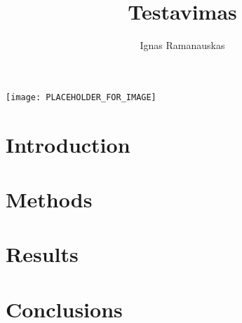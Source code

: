 \documentclass{article}
\author{Ignas Ramanauskas}
\title{Testavimas}
\begin{document}
\texttt{[image: PLACEHOLDER\_FOR\_IMAGE]}
\maketitle

\section{Introduction}
  \label{sec:intro}
  

\section{Methods}
  \label{sec:methods}
  

\section{Results}
  

\section{Conclusions}
  
\end{document}
